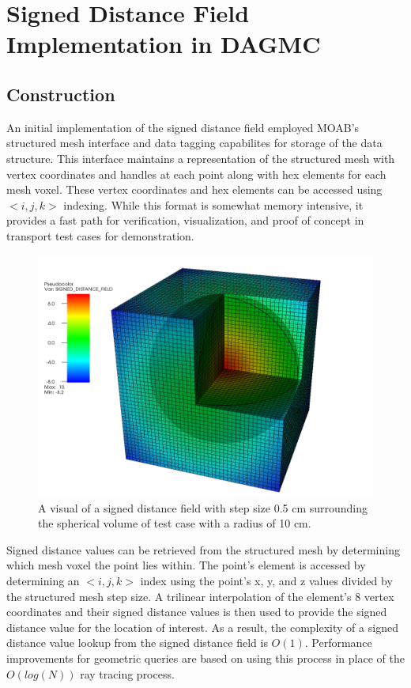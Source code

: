 \section{Signed Distance Field Implementation in DAGMC}

\subsection{Construction}

An initial implementation of the signed distance field employed MOAB's
structured mesh interface and data tagging capabilites for storage of the data
structure. This interface maintains a representation of the structured mesh with
vertex coordinates and handles at each point along with hex elements for each
mesh voxel. These vertex coordinates and hex elements can be accessed using
$<i,j,k>$ indexing. While this format is somewhat memory intensive, it provides
a fast path for verification, visualization, and proof of concept in transport
test cases for demonstration.

\begin{figure}
  \includegraphics[scale=0.22]{../images/sdf_sphere.png}
  \caption{A visual of a signed distance field with step size 0.5 cm surrounding
    the spherical volume of test case with a radius of 10 cm.}
  \label{fig:sdf_sphere}
\end{figure}

Signed distance values can be retrieved from the structured mesh by determining
which mesh voxel the point lies within. The point's element is accessed by
determining an $<i,j,k>$ index using the point's x, y, and z values divided by
the structured mesh step size. A trilinear interpolation of the element's 8 vertex
coordinates and their signed distance values is then used to provide the signed
distance value for the location of interest. As a result, the complexity of a
signed distance value lookup from the signed distance field is
$O(1)$. Performance improvements for geometric queries are based on using this
process in place of the $O(log(N))$ ray tracing process.

